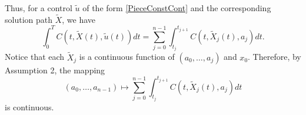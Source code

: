 \documentclass[a4paper,10pt]{amsart}
\begin{document}
Thus, for a control $\tilde{u}$ of the form \eqref{PieceConstCont} and the corresponding solution path $\tilde{X}$, we have
	\[  
	\int_0^T C(t,\tilde{X}(t),\tilde{u}(t)) dt   =     \sum_{j=0}^{n-1}   \int_{t_j}^{t_{j+1}} C(t,\tilde{X}_j(t),a_j) dt.
	\] 
Notice that each $\tilde{X}_j$ is a continuous function of $(a_0,\ldots,a_j)$	 and $x_0$. Therefore, by Assumption 2, the mapping 
		\[  
		(a_0,\ldots,a_{n-1}) \mapsto  \sum_{j=0}^{n-1}   \int_{t_j}^{t_{j+1}} C(t,\tilde{X}_j(t),a_j) dt
		\]
is continuous.	

    
    
    
    
    
    \nocite{*}
    
    
\end{document}
